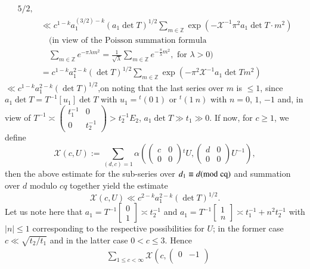 \begin{proofofprop}
\begin{align*}
  5/2,\\
&\ll c^{1-k}a_{1}^{(3/2)-k}(a_{1}\det
  T)^{1/2}\sum_{m\in\mathbb{Z}}\exp(-\mathscr{X}^{-1}\pi^{2}a_{1}\det
  T\cdot m^{2})\\
&\quad \text{(in view of the Poisson summation formula}\\
&\quad \sum_{m\in\mathbb{Z}}e^{-\pi \lambda
    m^{2}}=\frac{1}{\sqrt{\lambda}}\sum_{m\in\mathbb{Z}}e^{-\frac{\pi}{\lambda}m^{2}},
  \text{ \ for \ } \lambda>0)\\
&= c^{1-k}a^{2-k}_{1}(\det
  T)^{1/2}\sum_{m\in\mathbb{Z}}\exp(-\pi^{2}\mathscr{X}^{-1}a_{1}\det Tm^{2})
\end{align*}
$\ll c^{1-k}a^{2-k}_{1}(\det T)^{1/2}$,\pageoriginale on noting that
the last series 
over $m$ is $\leq 1$, since $a_{1}\det T=T^{-1}[u_{1}]\det T$ with
$u_{1}={}^{t}(0 \ 1)$ or ${}^{t}(1 \ n)$ with $n=0$, $1$, $-1$ 
and, in view of $T^{-1}\asymp \left(\begin{smallmatrix} t^{-1}_{1} &
  0\\ 0 & t^{-1}_{2}\end{smallmatrix}\right)>t^{-1}_{2}E_{2}$,
$a_{1}\det T\gg t_{1}\gg 0$. If now, for $c\geq 1$, we define
$$
\mathscr{X}(c,U):=\sum_{(d,c)=1}\alpha\left(
\begin{pmatrix}
c & 0\\
0 & 0
\end{pmatrix}{}^{t}U,
\begin{pmatrix}
d & 0\\
0 & 0
\end{pmatrix}U^{-1}\right),
$$
then the above estimate for the sub-series over $d_{1}\equiv
d(\rm{mod} \;
cq)$ and summation over $d$ modulo $cq$ together yield the estimate
$$
\mathscr{X}(c,U)\ll c^{2-k}a^{2-k}_{1}(\det T)^{1/2}.
$$
Let us note here that $a_{1}=T^{-1}[\begin{smallmatrix} 0 \\ 1 
  \end{smallmatrix}]\asymp t^{-1}_{2}$ and
$a_{1}=T^{-1}[\begin{smallmatrix} 1 \\ n 
  \end{smallmatrix}]\asymp t^{-1}_{1}+n^{2}t^{-1}_{2}$ with
$|n|\leq 1$ corresponding to the respective possibilities for $U$; in
the former case $c\ll \sqrt{t_{2}/t_{1}}$ and in the latter case
$0<c\leq 3$. Hence
\begin{align*}
& \sum_{1\leq c<\infty}\mathscr{X}\left(c,
\begin{pmatrix}
0 & -1\\

\end{pmatrix}
\end{align*}
\end{proofofprop}
